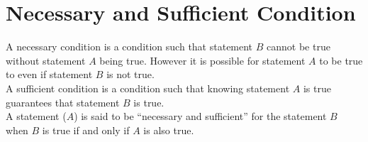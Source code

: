 \section{Necessary and Sufficient Condition}
A necessary condition is a condition such that statement $B$ cannot be true without statement $A$ being true. However it is possible for statement $A$ to be true to even if statement $B$ is not true.\\

A sufficient condition is a condition such that knowing statement $A$ is true guarantees that statement $B$ is true.\\

A statement ($A$) is said to be ``necessary and sufficient'' for the statement $B$ when $B$ is true if and only if $A$ is also true. 